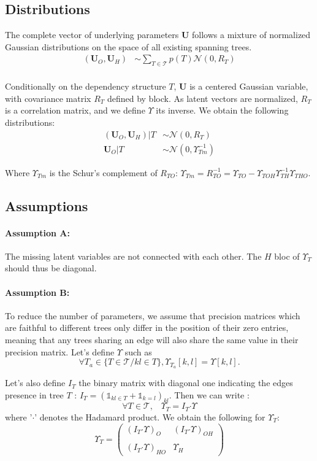 \documentclass[11pt,a4paper]{article}
\newcommand{\Ubf}{\boldsymbol{U}}
\newcommand{\had}{\boldsymbol{\cdot}}
\begin{document}
\subsection{Distributions}
\label{distrib}
 
The complete vector of underlying parameters $\Ubf$ follows a mixture of normalized Gaussian distributions on the space of all existing spanning trees.
\begin{align*}
(\Ubf_O,\Ubf_H) &\sim \sum_{T \in \mathcal{T}} p(T) \mathcal{N}(0,R_T) \\
\end{align*}

 
Conditionally on the dependency structure $T$, $\Ubf$ is a centered Gaussian variable, with covariance matrix $R_T$ defined by block. As latent vectors are normalized, $R_T$ is a correlation matrix, and we define $\Upsilon$ its inverse. We obtain the following distributions:
\begin{align*}
(\Ubf_O,\Ubf_H)|T & \sim\mathcal{N}(0,R_T)\\
\Ubf_O|T & \sim\mathcal{N}(0,\Upsilon_{Tm}^{-1})
\end{align*}
 

Where  $ \Upsilon_{Tm} $ is the Schur's complement of $R_{TO}$: $\Upsilon_{Tm}=R_{TO}^{-1} =  \Upsilon_{TO} - \Upsilon_{TOH}\Upsilon_{TH}^{-1}\Upsilon_{THO}$. 

\subsection{Assumptions}
\paragraph{Assumption A:} The missing latent variables are not connected with each other. The $H$ bloc of $\Upsilon_T$ should thus be diagonal.

\paragraph{Assumption B:} To reduce the number of parameters, we assume that precision matrices which are faithful to different trees  only differ in the position of their zero entries, meaning that any trees sharing  an edge will also share the same value in their precision matrix. Let's define $\Upsilon$ such as $$\forall T_a \in \{T \in\mathcal{T} / kl \in T \}, \Upsilon_{T_a}[k,l] =  \Upsilon [k,l].$$

 Let's also define $I_T$ the binary matrix with diagonal one indicating the  edges presence in tree $T$ : $I_T=(\mathds{1}_{kl \in T} + \mathds{1}_{k=l})_{kl}$. Then we can write :
$$\forall T\in \mathcal{T}, \;\;\; \Upsilon_T = I_T \had \Upsilon $$
where '$\had$' denotes the Hadamard product. We obtain the following for $\Upsilon_T$:
\[
 \Upsilon_T=
  \left( {\begin{array}{cc}
 (I_T \had \Upsilon)_O &  (I_T \had \Upsilon)_{OH}\\\\
 (I_T \had \Upsilon)_{HO} &   \Upsilon_H 
  \end{array} } \right) \]\\
 
\end{document}
